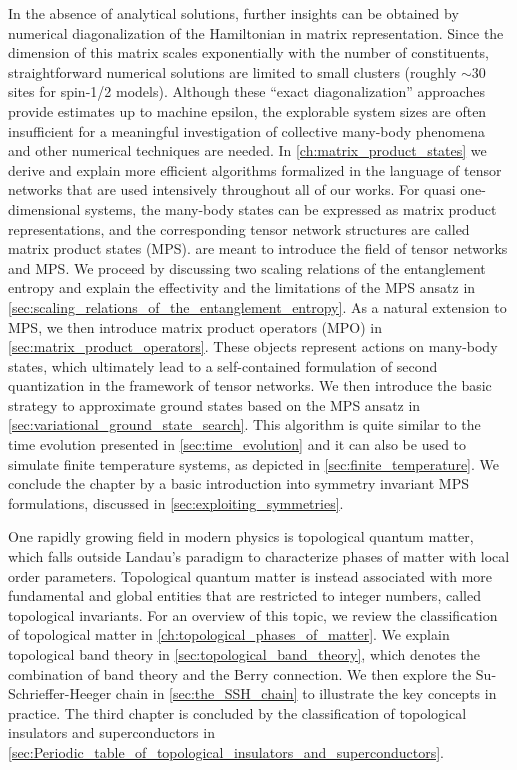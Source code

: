 In the absence of analytical solutions, further insights can be obtained by numerical diagonalization of the Hamiltonian in matrix representation.
Since the dimension of this matrix scales exponentially with the number of constituents, straightforward numerical solutions are limited to small clusters (roughly $\sim 30$ sites for spin-1/2 models).
Although these ``exact diagonalization'' approaches provide estimates up to machine epsilon, the explorable system sizes are often insufficient for a meaningful investigation of collective many-body phenomena and other numerical techniques are needed.
In \cref{ch:matrix_product_states} we derive and explain more efficient algorithms formalized in the language of tensor networks that are used intensively throughout all of our works.
For quasi one-dimensional systems, the many-body states can be expressed as matrix product representations, and the corresponding tensor network structures are called matrix product states (MPS).
 are meant to introduce the field of tensor networks and MPS.
We proceed by discussing two scaling relations of the entanglement entropy and explain the effectivity and the limitations of the MPS ansatz in \cref{sec:scaling_relations_of_the_entanglement_entropy}.
As a natural extension to MPS, we then introduce matrix product operators (MPO) in \cref{sec:matrix_product_operators}.
These objects represent actions on many-body states, which ultimately lead to a self-contained formulation of second quantization in the framework of tensor networks.
We then introduce the basic strategy to approximate ground states based on the MPS ansatz in \cref{sec:variational_ground_state_search}.
This algorithm is quite similar to the time evolution presented in \cref{sec:time_evolution} and it can also be used to simulate finite temperature systems, as depicted in \cref{sec:finite_temperature}.
We conclude the chapter by a basic introduction into symmetry invariant MPS formulations, discussed in \cref{sec:exploiting_symmetries}.

One rapidly growing field in modern physics is topological quantum matter, which falls outside Landau's paradigm to characterize phases of matter with local order parameters.
Topological quantum matter is instead associated with more fundamental and global entities that are restricted to integer numbers, called topological invariants.
For an overview of this topic, we review the classification of topological matter in \cref{ch:topological_phases_of_matter}.
We explain topological band theory in \cref{sec:topological_band_theory}, which denotes the combination of band theory and the Berry connection.
We then explore the Su-Schrieffer-Heeger chain in \cref{sec:the_SSH_chain} to illustrate the key concepts in practice.
The third chapter is concluded by the classification of topological insulators and superconductors in \cref{sec:Periodic_table_of_topological_insulators_and_superconductors}.


